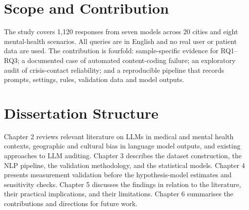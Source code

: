 \section{Scope and Contribution}

The study covers 1,120 responses from seven models across 20 cities and eight mental-health scenarios. All queries are in English and no real user or patient data are used. The contribution is fourfold: sample-specific evidence for RQ1--RQ3; a documented case of automated content-coding failure; an exploratory audit of crisis-contact reliability; and a reproducible pipeline that records prompts, settings, rules, validation data and model outputs.

\section{Dissertation Structure}

Chapter 2 reviews relevant literature on LLMs in medical and mental health contexts, geographic and cultural bias in language model outputs, and existing approaches to LLM auditing. Chapter 3 describes the dataset construction, the NLP pipeline, the validation methodology, and the statistical models. Chapter 4 presents measurement validation before the hypothesis-model estimates and sensitivity checks. Chapter 5 discusses the findings in relation to the literature, their practical implications, and their limitations. Chapter 6 summarises the contributions and directions for future work.
